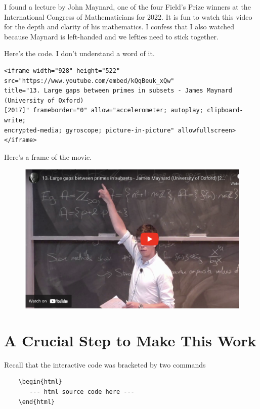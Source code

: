 \documentclass[11pt, oneside]{article}   	%
\begin{document}
I found a lecture by John Maynard, one of the four Field's Prize winners at the International Congress of Mathematicians for 2022. It is fun to watch this video for the depth and clarity of his mathematics. I confess that I also watched because Maynard is left-handed and we lefties need to stick together.  

Here's the code. I don't understand a word of it.
\begin{verbatim}
<iframe width="928" height="522" src="https://www.youtube.com/embed/kQqBeuk_xQw" 
title="13. Large gaps between primes in subsets - James Maynard (University of Oxford) 
[2017]" frameborder="0" allow="accelerometer; autoplay; clipboard-write; 
encrypted-media; gyroscope; picture-in-picture" allowfullscreen></iframe>
\end{verbatim}

Here's a frame of the movie.

\begin{figure}[H] %
     \hspace{.2in}  \includegraphics[width=5.2in.]{Graphics/shot12.png} %
\end{figure}



 
\section{A Crucial Step to Make This Work}

Recall that the interactive code was bracketed by two commands
\begin{verbatim}
    \begin{html}
       --- html source code here ---
    \end{html}
\end{verbatim}
\end{document}
